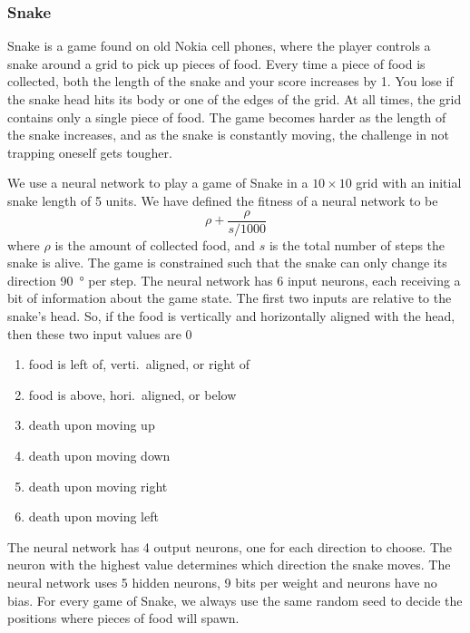 \subsubsection{Snake}
Snake is a game found on old Nokia cell phones, where the player controls a snake around a grid to pick up pieces of food.
Every time a piece of food is collected, both the length of the snake and your score increases by 1.
You lose if the snake head hits its body or one of the edges of the grid.
At all times, the grid contains only a single piece of food.
The game becomes harder as the length of the snake increases, and as the snake is constantly moving, the challenge in not trapping oneself gets tougher.

We use a neural network to play a game of Snake in a $10 \times 10$ grid with an initial snake length of 5 units.
We have defined the fitness of a neural network to be 
\[
  \rho + \frac{\rho}{s/1000}
\]
where $\rho$ is the amount of collected food, and $s$ is the total number of steps the snake is alive. The game is constrained such that the snake can only change its direction \SI{90}{\degree} per step. The neural network has 6 input neurons, each receiving a bit of information about the game state. The first two inputs are relative to the snake's head. So, if the food is vertically and horizontally aligned with the head, then these two input values are 0
\begin{enumerate}
  \item {} food is left of, verti.\ aligned, or right of
  \item {} food is above, hori.\ aligned, or below
  \item {} death upon moving up 
  \item {} death upon moving down 
  \item {} death upon moving right
  \item {} death upon moving left 
\end{enumerate}
The neural network has 4 output neurons, one for each direction to choose. The neuron with the highest value determines which direction the snake moves.
The neural network uses 5 hidden neurons, 9 bits per weight and neurons have no bias.
For every game of Snake, we always use the same random seed to decide the positions where pieces of food will spawn.
